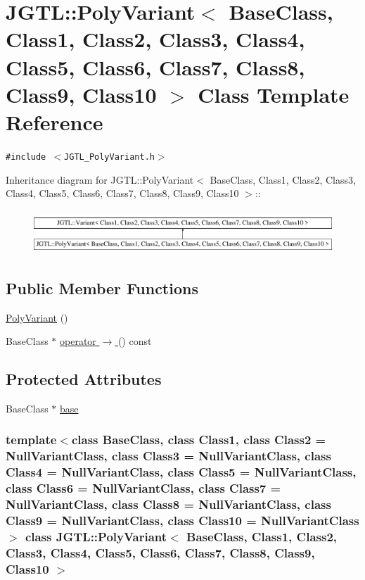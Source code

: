 \hypertarget{class_j_g_t_l_1_1_poly_variant}{
\section{JGTL::Poly\-Variant$<$ Base\-Class, Class1, Class2, Class3, Class4, Class5, Class6, Class7, Class8, Class9, Class10 $>$ Class Template Reference}
\label{class_j_g_t_l_1_1_poly_variant}
}
{\tt \#include $<$JGTL\_\-Poly\-Variant.h$>$}

Inheritance diagram for JGTL::Poly\-Variant$<$ Base\-Class, Class1, Class2, Class3, Class4, Class5, Class6, Class7, Class8, Class9, Class10 $>$::\begin{figure}[H]
\begin{center}
\leavevmode
\includegraphics[height=1.64223cm]{class_j_g_t_l_1_1_poly_variant}
\end{center}
\end{figure}
\subsection*{Public Member Functions}
\begin{CompactItemize}
\item 
\hyperlink{class_j_g_t_l_1_1_poly_variant_cf2f8c79c9a93f0070cfba77cfa43d58}{Poly\-Variant} ()
\item 
Base\-Class $\ast$ \hyperlink{class_j_g_t_l_1_1_poly_variant_cee1586dc24e7836fc0cf19f9ffc5bd7}{operator $\rightarrow$ } () const
\end{CompactItemize}
\subsection*{Protected Attributes}
\begin{CompactItemize}
\item 
Base\-Class $\ast$ \hyperlink{class_j_g_t_l_1_1_poly_variant_9731a2eb9f328710229e3574e9063caa}{base}
\end{CompactItemize}
\subsubsection*{template$<$class Base\-Class, class Class1, class Class2 = Null\-Variant\-Class, class Class3 = Null\-Variant\-Class, class Class4 = Null\-Variant\-Class, class Class5 = Null\-Variant\-Class, class Class6 = Null\-Variant\-Class, class Class7 = Null\-Variant\-Class, class Class8 = Null\-Variant\-Class, class Class9 = Null\-Variant\-Class, class Class10 = Null\-Variant\-Class$>$ class JGTL::Poly\-Variant$<$ Base\-Class, Class1, Class2, Class3, Class4, Class5, Class6, Class7, Class8, Class9, Class10 $>$}



